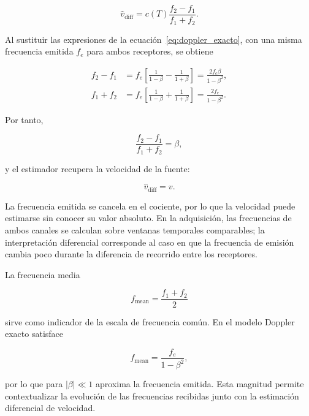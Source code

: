 \begin{equation}
    \hat{v}_{\mathrm{diff}} =
    c(T)\frac{f_2-f_1}{f_1+f_2}.
    \label{eq:doppler_diferencial_formal}
\end{equation}

Al sustituir las expresiones de la ecuación~\eqref{eq:doppler_exacto},
con una misma frecuencia emitida $f_e$ para ambos receptores, se obtiene

\begin{align}
    f_2-f_1
    &= f_e\left[
    \frac{1}{1-\beta}-\frac{1}{1+\beta}
    \right]
    = \frac{2f_e\beta}{1-\beta^2},
    \\
    f_1+f_2
    &= f_e\left[
    \frac{1}{1-\beta}+\frac{1}{1+\beta}
    \right]
    = \frac{2f_e}{1-\beta^2}.
\end{align}

Por tanto,

\begin{equation}
    \frac{f_2-f_1}{f_1+f_2}=\beta,
\end{equation}

y el estimador recupera la velocidad de la fuente:

\begin{equation}
    \hat{v}_{\mathrm{diff}}=v.
    \label{eq:velocidad_final_doppler}
\end{equation}

La frecuencia emitida se cancela en el cociente, por lo que la
velocidad puede estimarse sin conocer su valor absoluto. En la
adquisición, las frecuencias de ambos canales se calculan sobre
ventanas temporales comparables; la interpretación diferencial
corresponde al caso en que la frecuencia de emisión cambia poco
durante la diferencia de recorrido entre los receptores.

La frecuencia media

\begin{equation}
    f_{\mathrm{mean}} = \frac{f_1+f_2}{2}
    \label{eq:f0_common}
\end{equation}

sirve como indicador de la escala de frecuencia común. En el modelo
Doppler exacto satisface

\begin{equation}
    f_{\mathrm{mean}} = \frac{f_e}{1-\beta^2},
\end{equation}

por lo que para $|\beta|\ll1$ aproxima la frecuencia emitida. Esta
magnitud permite contextualizar la evolución de las frecuencias
recibidas junto con la estimación diferencial de velocidad.

